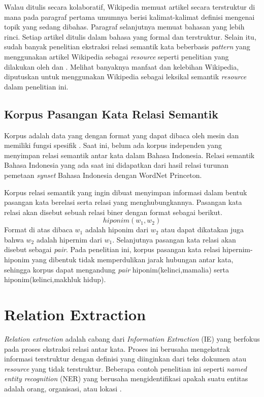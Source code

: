 Walau ditulis secara kolaboratif, Wikipedia memuat artikel secara terstruktur di mana pada paragraf pertama umumnya berisi kalimat-kalimat definisi mengenai topik yang sedang dibahas. Paragraf selanjutnya memuat bahasan yang lebih rinci. Setiap artikel ditulis dalam bahasa yang formal dan terstruktur. Selain itu, sudah banyak penelitian ekstraksi relasi semantik kata beberbasis \textit{pattern} yang menggunakan artikel Wikipedia sebagai \textit{resource} seperti penelitian yang dilakukan oleh \cite{ruiz2005automatic} dan \cite{arnold2014extracting}. Melihat banyaknya manfaat dan kelebihan Wikipedia, diputuskan untuk menggunakan Wikipedia sebagai leksikal semantik \textit{resource} dalam penelitian ini. 


\subsection{Korpus Pasangan Kata Relasi Semantik}
Korpus adalah data yang dengan format yang dapat dibaca oleh mesin dan memiliki fungsi spesifik \citep{atkins1992corpus}. Saat ini, belum ada korpus independen yang menyimpan relasi semantik antar kata dalam Bahasa Indonesia. Relasi semantik Bahasa Indonesia yang ada saat ini didapatkan dari hasil relasi turunan pemetaan \textit{synset} Bahasa Indonesia dengan WordNet Princeton. 

Korpus relasi semantik yang ingin dibuat menyimpan informasi dalam bentuk pasangan kata berelasi serta relasi yang menghubungkannya. Pasangan kata relasi akan disebut sebuah relasi biner dengan format sebagai berikut.
\[ hiponim(w_1,w_2) \]
\noindent Format di atas dibaca $w_1$ adalah hiponim dari $w_2$ atau dapat dikatakan juga bahwa $w_2$ adalah hipernim dari $w_1$. Selanjutnya pasangan kata relasi akan disebut sebagai \textit{pair}. Pada penelitian ini, korpus pasangan kata relasi hipernim-hiponim yang dibentuk tidak memperdulikan jarak hubungan antar kata, sehingga korpus dapat mengandung \textit{pair} hiponim(kelinci,mamalia) serta hiponim(kelinci,makhluk hidup).


\section{Relation Extraction}
\textit{Relation extraction} adalah cabang dari \textit{Information Extraction} (IE) yang berfokus pada proses ekstraksi relasi antar kata. Proses ini berusaha mengekstrak informasi terstruktur dengan definisi yang diinginkan dari teks dokumen atau \textit{resource} yang tidak terstruktur. Beberapa contoh penelitian ini seperti \textit{named entity recognition} (NER) yang berusaha mengidentifikasi apakah suatu entitas adalah orang, organisasi, atau lokasi \citep{bikel1999algorithm}. 

